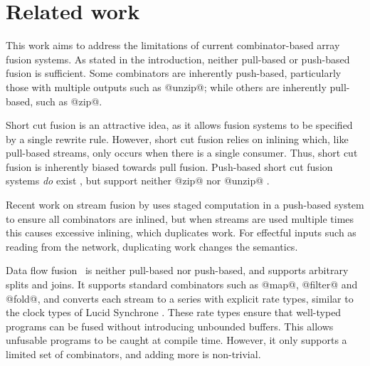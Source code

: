 \chapter{Related work}
\label{related}

This work aims to address the limitations of current combinator-based array fusion systems.
As stated in the introduction, neither pull-based or push-based fusion is sufficient.
Some combinators are inherently push-based, particularly those with multiple outputs such as @unzip@; while others are inherently pull-based, such as @zip@.

Short cut fusion is an attractive idea, as it allows fusion systems to be specified by a single rewrite rule.
However, short cut fusion relies on inlining which, like pull-based streams, only occurs when there is a single consumer.
Thus, short cut fusion is inherently biased towards pull fusion.
Push-based short cut fusion systems \emph{do} exist \cite{gill1993short}, but support neither @zip@ nor @unzip@ \cite{svenningsson2002shortcut,lippmeier2013data}.

Recent work on stream fusion by \citet{kiselyov2016stream} uses staged computation in a push-based system to ensure all combinators are inlined, but when streams are used multiple times this causes excessive inlining, which duplicates work.
For effectful inputs such as reading from the network, duplicating work changes the semantics.

Data flow fusion~\cite{lippmeier2013data} is neither pull-based nor push-based, and supports arbitrary splits and joins.
It supports standard combinators such as @map@, @filter@ and @fold@, and converts each stream to a series with explicit rate types, similar to the clock types of Lucid Synchrone \cite{benveniste2003synchronous}.
These rate types ensure that well-typed programs can be fused without introducing unbounded buffers.
This allows unfusable programs to be caught at compile time.
However, it only supports a limited set of combinators, and adding more is non-trivial.

